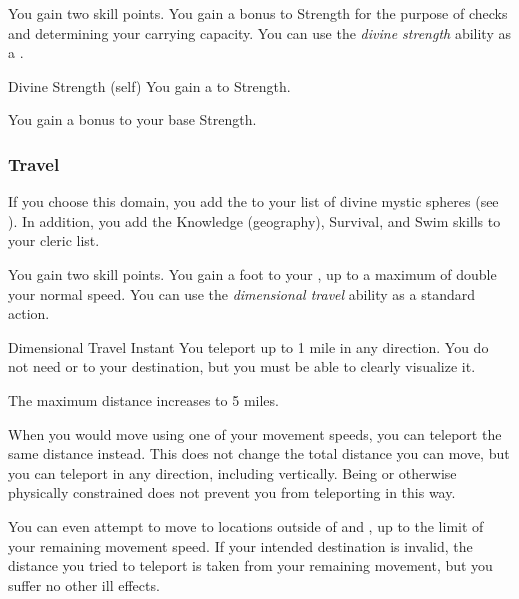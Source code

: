              You gain two skill points.
             You gain a  bonus to Strength for the purpose of checks and determining your carrying capacity.
             You can use the \textit{divine strength} ability as a .
            \begin{attuneability}{Divine Strength}
                 (self)
                \rankline
                You gain a   to Strength.
            \end{attuneability}
             You gain a  bonus to your base Strength.

        \subsubsection{Travel}
            If you choose this domain, you add the   to your list of divine mystic spheres (see ).
            In addition, you add the Knowledge (geography), Survival, and Swim skills to your cleric  list.

             You gain two skill points.
             You gain a  foot  to your , up to a maximum of double your normal speed.
             You can use the \textit{dimensional travel} ability as a standard action.
            \begin{instantability}{Dimensional Travel}
                Instant
                \rankline
                You teleport up to 1 mile in any direction.
                You do not need  or  to your destination, but you must be able to clearly visualize it.

                \rankline
                 The maximum distance increases to 5 miles.
            \end{instantability}
             When you would move using one of your movement speeds, you can teleport the same distance instead.
            This does not change the total distance you can move, but you can teleport in any direction, including vertically.
            Being \grappled or otherwise physically constrained does not prevent you from teleporting in this way.

            You can even attempt to move to locations outside of  and , up to the limit of your remaining movement speed.
            If your intended destination is invalid, the distance you tried to teleport is taken from your remaining movement, but you suffer no other ill effects.

